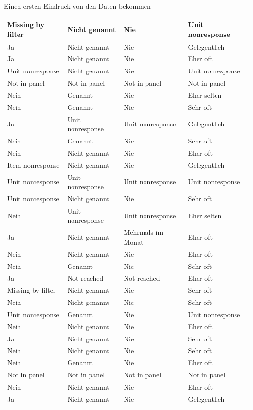 \documentclass[ignorenonframetext,]{beamer}
\begin{document}
\begin{frame}{Einen ersten Eindruck von den Daten bekommen}
\begin{tabular}{l|l|l|l}
\hline
Missing by filter & Nicht genannt & Nie & Unit nonresponse\\
\hline
Ja & Nicht genannt & Nie & Gelegentlich\\
\hline
Ja & Nicht genannt & Nie & Eher oft\\
\hline
Unit nonresponse & Nicht genannt & Nie & Unit nonresponse\\
\hline
Not in panel & Not in panel & Not in panel & Not in panel\\
\hline
Nein & Genannt & Nie & Eher selten\\
\hline
Nein & Genannt & Nie & Sehr oft\\
\hline
Ja & Unit nonresponse & Unit nonresponse & Gelegentlich\\
\hline
Nein & Genannt & Nie & Sehr oft\\
\hline
Nein & Nicht genannt & Nie & Eher oft\\
\hline
Item nonresponse & Nicht genannt & Nie & Gelegentlich\\
\hline
Unit nonresponse & Unit nonresponse & Unit nonresponse & Unit nonresponse\\
\hline
Unit nonresponse & Nicht genannt & Nie & Sehr oft\\
\hline
Nein & Unit nonresponse & Unit nonresponse & Eher selten\\
\hline
Ja & Nicht genannt & Mehrmals im Monat & Eher oft\\
\hline
Nein & Nicht genannt & Nie & Eher oft\\
\hline
Nein & Genannt & Nie & Sehr oft\\
\hline
Ja & Not reached & Not reached & Eher oft\\
\hline
Missing by filter & Nicht genannt & Nie & Sehr oft\\
\hline
Nein & Nicht genannt & Nie & Sehr oft\\
\hline
Unit nonresponse & Genannt & Nie & Unit nonresponse\\
\hline
Nein & Nicht genannt & Nie & Eher oft\\
\hline
Ja & Nicht genannt & Nie & Sehr oft\\
\hline
Nein & Nicht genannt & Nie & Sehr oft\\
\hline
Nein & Genannt & Nie & Eher oft\\
\hline
Not in panel & Not in panel & Not in panel & Not in panel\\
\hline
Nein & Nicht genannt & Nie & Eher oft\\
\hline
Ja & Nicht genannt & Nie & Gelegentlich\\

\end{tabular}
\end{frame}
\end{document}
